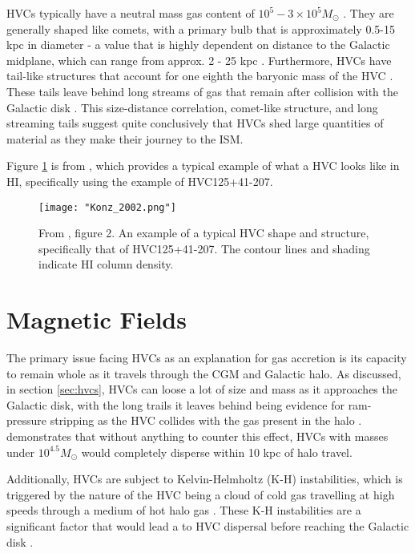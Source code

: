 HVCs typically have a neutral mass gas content of $10^5 - 3\times10^5 M_{\odot}$ \citep{ID19}. They are generally shaped like comets, with a primary bulb that is approximately 0.5-15 kpc in diameter - a value that is highly dependent on distance to the Galactic midplane, which can range from approx. 2 - 25 kpc \citep{ID19, ID13}. Furthermore, HVCs have tail-like structures that account for one eighth the baryonic mass of the HVC \citep{ID13}. These tails leave behind long streams of gas that remain after collision with the Galactic disk \citep{ID19}. This size-distance correlation, comet-like structure, and long streaming tails suggest quite conclusively that HVCs shed large quantities of material as they make their journey to the ISM.


Figure \ref{fig:hvc_example} is from \cite{ID13}, which provides a typical example of what a HVC looks like in HI, specifically using the example of HVC125+41-207.

\begin{figure}
    \texttt{[image: "Konz\_2002.png"]}
    \centering
    \caption{From \cite{ID13}, figure 2. An example of a typical HVC shape and structure, specifically that of HVC125+41-207. The contour lines and shading indicate HI column density.}
    \label{fig:hvc_example}
\end{figure}


\section{Magnetic Fields}
\label{sec:bfields}

The primary issue facing HVCs as an explanation for gas accretion is its capacity to remain whole as it travels through the CGM and Galactic halo. As discussed, in section \ref{sec:hvcs}, HVCs can loose a lot of size and mass as it approaches the Galactic disk, with the long trails it leaves behind being evidence for ram-pressure stripping as the HVC collides with the gas present in the halo \citep{ID11, ID23, ID33}. \cite{ID25} demonstrates that without anything to counter this effect, HVCs with masses under $10^{4.5} M_{\odot}$ would completely disperse within 10 kpc of halo travel.


Additionally, HVCs are subject to Kelvin-Helmholtz (K-H) instabilities, which is triggered by the nature of the HVC being a cloud of cold gas travelling at high speeds through a medium of hot halo gas \citep{ID51}. These K-H instabilities are a significant factor that would lead a to HVC dispersal before reaching the Galactic disk \citep{ID11, ID23, ID33}.


